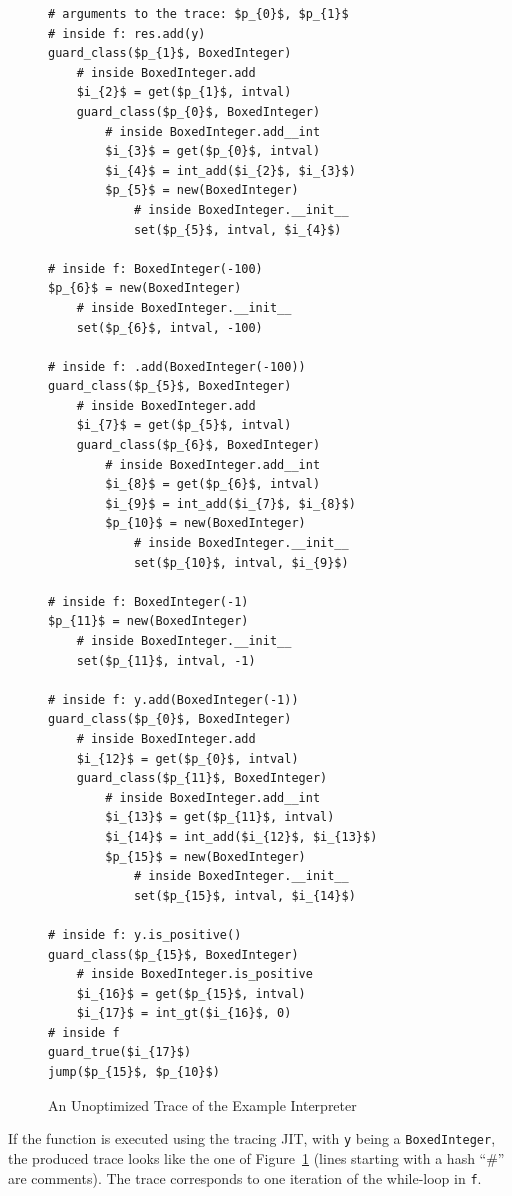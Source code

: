 \documentclass{sigplanconf}
\begin{document}
\begin{figure}
\begin{lstlisting}[mathescape,numbers = right,basicstyle=\setstretch{1.1}\ttfamily\scriptsize]
# arguments to the trace: $p_{0}$, $p_{1}$
# inside f: res.add(y)
guard_class($p_{1}$, BoxedInteger)
    # inside BoxedInteger.add
    $i_{2}$ = get($p_{1}$, intval)
    guard_class($p_{0}$, BoxedInteger)
        # inside BoxedInteger.add__int
        $i_{3}$ = get($p_{0}$, intval)
        $i_{4}$ = int_add($i_{2}$, $i_{3}$)
        $p_{5}$ = new(BoxedInteger)
            # inside BoxedInteger.__init__
            set($p_{5}$, intval, $i_{4}$)

# inside f: BoxedInteger(-100) 
$p_{6}$ = new(BoxedInteger)
    # inside BoxedInteger.__init__
    set($p_{6}$, intval, -100)

# inside f: .add(BoxedInteger(-100))
guard_class($p_{5}$, BoxedInteger)
    # inside BoxedInteger.add
    $i_{7}$ = get($p_{5}$, intval)
    guard_class($p_{6}$, BoxedInteger)
        # inside BoxedInteger.add__int
        $i_{8}$ = get($p_{6}$, intval)
        $i_{9}$ = int_add($i_{7}$, $i_{8}$)
        $p_{10}$ = new(BoxedInteger)
            # inside BoxedInteger.__init__
            set($p_{10}$, intval, $i_{9}$)

# inside f: BoxedInteger(-1)
$p_{11}$ = new(BoxedInteger)
    # inside BoxedInteger.__init__
    set($p_{11}$, intval, -1)

# inside f: y.add(BoxedInteger(-1))
guard_class($p_{0}$, BoxedInteger)
    # inside BoxedInteger.add
    $i_{12}$ = get($p_{0}$, intval)
    guard_class($p_{11}$, BoxedInteger)
        # inside BoxedInteger.add__int
        $i_{13}$ = get($p_{11}$, intval)
        $i_{14}$ = int_add($i_{12}$, $i_{13}$)
        $p_{15}$ = new(BoxedInteger)
            # inside BoxedInteger.__init__
            set($p_{15}$, intval, $i_{14}$)

# inside f: y.is_positive()
guard_class($p_{15}$, BoxedInteger)
    # inside BoxedInteger.is_positive
    $i_{16}$ = get($p_{15}$, intval)
    $i_{17}$ = int_gt($i_{16}$, 0)
# inside f
guard_true($i_{17}$)
jump($p_{15}$, $p_{10}$)
\end{lstlisting}
\caption{An Unoptimized Trace of the Example Interpreter}
\label{fig:unopt-trace}
\end{figure}

If the function is executed using the tracing JIT, with \lstinline{y} being a
\lstinline{BoxedInteger}, the produced trace looks like the one of
Figure~\ref{fig:unopt-trace} (lines starting with a hash ``\#'' are comments).
The trace corresponds to one iteration of the while-loop in \lstinline{f}.
\end{document}
